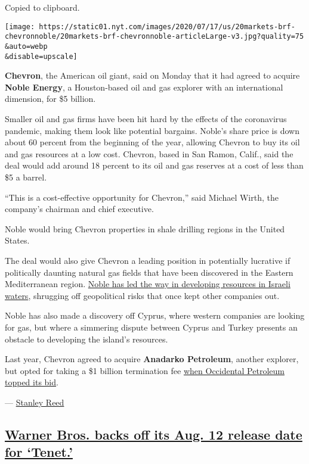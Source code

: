 Copied to clipboard.

\texttt{[image: https://static01.nyt.com/images/2020/07/17/us/20markets-brf-chevronnoble/20markets-brf-chevronnoble-articleLarge-v3.jpg?quality=75\\\&auto=webp\\\&disable=upscale]}

\textbf{Chevron}, the American oil giant, said on Monday that it had
agreed to acquire \textbf{Noble Energy}, a Houston-based oil and gas
explorer with an international dimension, for \$5 billion.

Smaller oil and gas firms have been hit hard by the effects of the
coronavirus pandemic, making them look like potential bargains. Noble's
share price is down about 60 percent from the beginning of the year,
allowing Chevron to buy its oil and gas resources at a low cost.
Chevron, based in San Ramon, Calif., said the deal would add around 18
percent to its oil and gas reserves at a cost of less than \$5 a barrel.

``This is a cost-effective opportunity for Chevron,'' said Michael
Wirth, the company's chairman and chief executive.

Noble would bring Chevron properties in shale drilling regions in the
United States.

The deal would also give Chevron a leading position in potentially
lucrative if politically daunting natural gas fields that have been
discovered in the Eastern Mediterranean region.
\href{https://www.nytimes.com/2014/12/15/business/energy-environment/israels-natural-gas-supply-offers-lifeline-for-peace.html?searchResultPosition=1}{Noble
has led the way in developing resources in Israeli waters}, shrugging
off geopolitical risks that once kept other companies out.

Noble has also made a discovery off Cyprus, where western companies are
looking for gas, but where a simmering dispute between Cyprus and Turkey
presents an obstacle to developing the island's resources.

Last year, Chevron agreed to acquire \textbf{Anadarko Petroleum},
another explorer, but opted for taking a \$1 billion termination fee
\href{https://www.nytimes.com/2019/05/09/business/chevron-anadarko-occidental-permian.html?searchResultPosition=5}{when
Occidental Petroleum topped its bid}.

--- \href{https://www.nytimes.com/by/stanley-reed}{Stanley Reed}

\hypertarget{warner-bros-backs-off-its-aug-12-release-date-for-tenet}{%
\subsection{\texorpdfstring{\protect\hyperlink{warner-bros-backs-off-its-aug-12-release-date-for-tenet}{Warner
Bros. backs off its Aug. 12 release date for
`Tenet.'}}{Warner Bros. backs off its Aug. 12 release date for `Tenet.'}}\label{warner-bros-backs-off-its-aug-12-release-date-for-tenet}}

